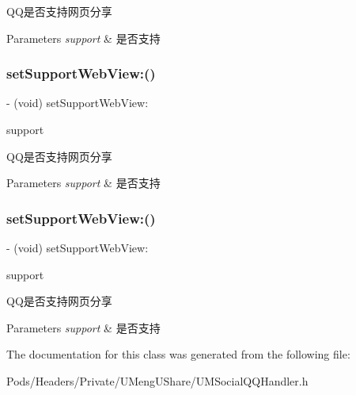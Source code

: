 Q\+Q是否支持网页分享 
\begin{DoxyParams}{Parameters}
{\em support} & 是否支持 \\
\hline
\end{DoxyParams}
\mbox{\label{interface_u_m_social_q_q_handler_a22e62d8b1b36ab0cef2e16e2377f2b1e}} 
\subsubsection{\texorpdfstring{set\+Support\+Web\+View\+:()}{setSupportWebView:()}\hspace{0.1cm}{\footnotesize\ttfamily [2/3]}}
{\footnotesize\ttfamily -\/ (void) set\+Support\+Web\+View\+: \begin{DoxyParamCaption}\item[{(B\+O\+OL)}]{support }\end{DoxyParamCaption}}

Q\+Q是否支持网页分享 
\begin{DoxyParams}{Parameters}
{\em support} & 是否支持 \\
\hline
\end{DoxyParams}
\mbox{\label{interface_u_m_social_q_q_handler_a22e62d8b1b36ab0cef2e16e2377f2b1e}} 
\subsubsection{\texorpdfstring{set\+Support\+Web\+View\+:()}{setSupportWebView:()}\hspace{0.1cm}{\footnotesize\ttfamily [3/3]}}
{\footnotesize\ttfamily -\/ (void) set\+Support\+Web\+View\+: \begin{DoxyParamCaption}\item[{(B\+O\+OL)}]{support }\end{DoxyParamCaption}}

Q\+Q是否支持网页分享 
\begin{DoxyParams}{Parameters}
{\em support} & 是否支持 \\
\hline
\end{DoxyParams}


The documentation for this class was generated from the following file\+:\begin{DoxyCompactItemize}
\item 
Pods/\+Headers/\+Private/\+U\+Meng\+U\+Share/U\+M\+Social\+Q\+Q\+Handler.\+h\end{DoxyCompactItemize}
